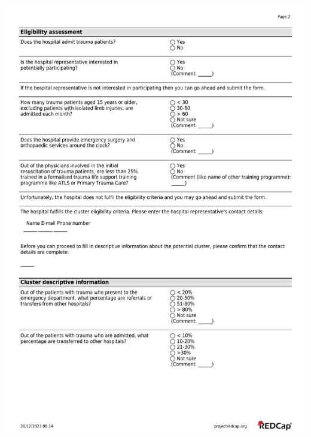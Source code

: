 \documentclass[
]{scrartcl}
\begin{document}
\includegraphics{./appendices/hospital-screening-instrument/hospital-screening-instrument-2.pdf}
\end{document}
